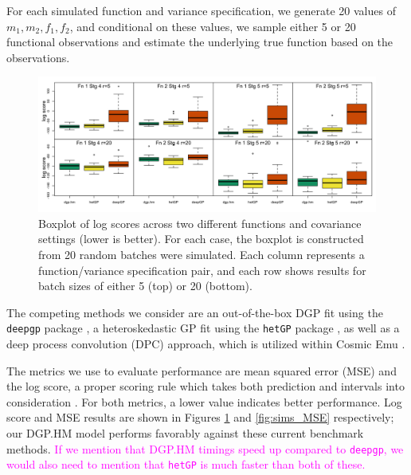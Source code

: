 \documentclass[11pt]{article}
\begin{document}
For each simulated function and variance specification, we generate 20 values of 
$m_1, m_2, f_1, f_2$, and conditional on these values, we sample either 5 or 20 
functional observations and estimate the underlying true function based on the observations.

\begin{figure}[t]
    \centering
    \includegraphics[width=6in]{sims_logS.png}
    \caption{Boxplot of log scores across two different functions and covariance 
             settings (lower is better). For each case, the boxplot is constructed 
             from 20 random batches were simulated. Each column represents a function/variance 
             specification pair, and each row shows results for batch sizes of either 
             5 (top) or 20 (bottom).}
    \label{fig:sims_logS}
\end{figure}

The competing methods we consider are an out-of-the-box DGP fit using the 
\texttt{deepgp} package \citep{sauer2023active}, a heteroskedastic GP fit using 
the \texttt{hetGP} package \citep{binois2018practical, binois2021hetgp}, as well 
as a deep process convolution (DPC) approach, which is utilized within Cosmic 
Emu \citep{moran2023mira}. 

The metrics we use to evaluate performance are mean squared error (MSE) and the 
log score, a proper scoring rule which takes both prediction and intervals into 
consideration \citep{gneiting2007strictly}. For both metrics, a lower value indicates 
better performance. Log score and MSE results are shown in Figures \ref{fig:sims_logS} 
and \ref{fig:sims_MSE} respectively; our DGP.HM model performs favorably against 
these current benchmark methods. \textcolor{magenta}{If we mention that DGP.HM timings 
speed up compared to \texttt{deepgp}, we would also need to mention that \texttt{hetGP} 
is much faster than both of these.}
\end{document}
